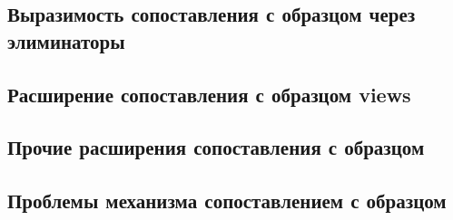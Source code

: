 \documentclass[14pt, a4paper]{extarticle}
\begin{document}
\subsection{Выразимость сопоставления с образцом через элиминаторы}


\subsection{Расширение сопоставления с образцом views}


\subsection{Прочие расширения сопоставления с образцом}


\subsection{Проблемы механизма сопоставлением с образцом}


\newpage


\end{document}
